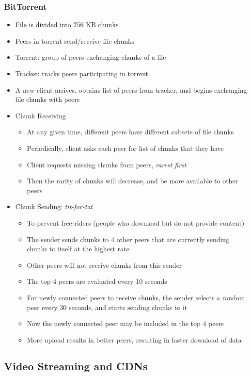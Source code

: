 \subsubsection{BitTorrent}
\begin{itemize}
	\item File is divided into 256 KB chunks
	\item Peers in torrent send/receive file chunks
	\item Torrent: group of peers exchanging chunks of a file
	\item Tracker: tracks peers participating in torrent
	\item A new client arrives, obtains list of peers from tracker, and begins exchanging file chunks with peers
	\item Chunk Receiving
	\begin{itemize}
		\item At any given time, different peers have different subsets of file chunks
		\item Periodically, client asks each peer for list of chunks that they have
		\item Client requests missing chunks from peers, \textit{rarest first}
		\item Then the rarity of chunks will decrease, and be more available to other peers
	\end{itemize}
	\item Chunk Sending: \textit{tit-for-tat}
	\begin{itemize}
		\item To prevent free-riders (people who download but do not provide content)
		\item The sender sends chunks to 4 other peers that are currently sending chunks to itself at the highest rate
		\item Other peers will not receive chunks from this sender
		\item The top 4 peers are evaluated every 10 seconds
		\item For newly connected peers to receive chunks, the sender selects a random peer every 30 seconds, and starts sending chunks to it
		\item Now the newly connected peer may be included in the top 4 peers
		\item More upload results in better peers, resulting in faster download of data
	\end{itemize}
\end{itemize}

\subsection{Video Streaming and CDNs}
